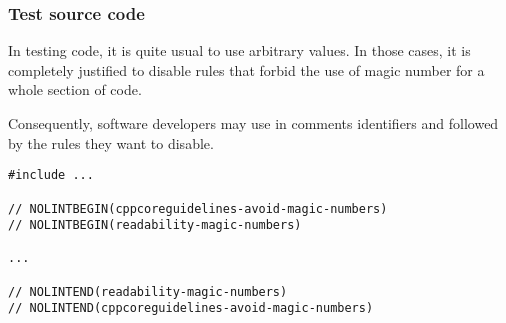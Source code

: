 \subsubsection{Test source code}

In testing code, it is quite usual to use arbitrary values. In those cases, it
is completely justified to disable rules that forbid the use of magic number for
a whole section of code.

Consequently, software developers may use in comments identifiers
 and  
followed by the rules they want to disable.

\begin{lstlisting}
#include ...

// NOLINTBEGIN(cppcoreguidelines-avoid-magic-numbers)
// NOLINTBEGIN(readability-magic-numbers)

...

// NOLINTEND(readability-magic-numbers)
// NOLINTEND(cppcoreguidelines-avoid-magic-numbers)
\end{lstlisting}

